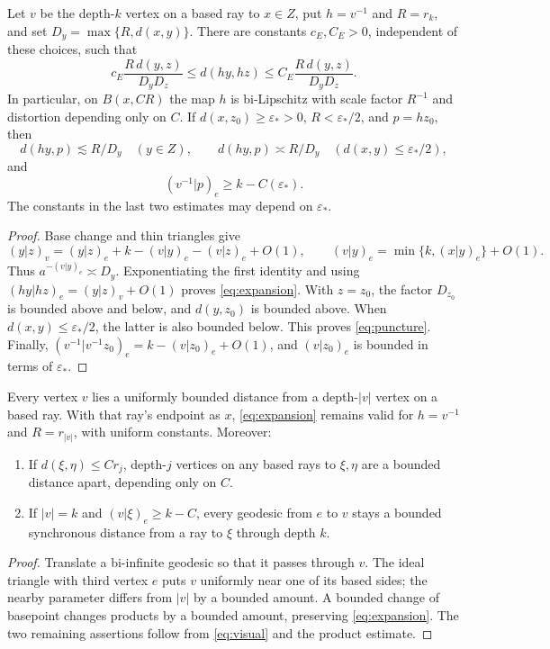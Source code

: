 \begin{lemma}
\label{lem:expansion}
Let $v$ be the depth-$k$ vertex on a based ray to $x\in Z$, put
$h=v^{-1}$ and $R=r_k$, and set $D_y=\max\{R,d(x,y)\}$.
There are constants $c_E,C_E>0$, independent of these choices, such that
\begin{equation}
 c_E\frac{R\,d(y,z)}{D_yD_z}
 \le d(hy,hz)\le C_E\frac{R\,d(y,z)}{D_yD_z}.
 \label{eq:expansion}
\end{equation}
In particular, on $B(x,CR)$ the map $h$ is bi-Lipschitz with scale
factor $R^{-1}$ and distortion depending only on $C$.
If $d(x,z_0)\ge\varepsilon_*>0$, $R<\varepsilon_*/2$, and $p=hz_0$, then
\begin{equation}
 d(hy,p)\lesssim R/D_y\quad(y\in Z),\qquad
 d(hy,p)\asymp R/D_y\quad(d(x,y)\le\varepsilon_*/2),
 \label{eq:puncture}
\end{equation}
and
\begin{equation}
 (v^{-1}|p)_e\ge k-C(\varepsilon_*).
 \label{eq:inverse-prefix}
\end{equation}
The constants in the last two estimates may depend on $\varepsilon_*$.
\end{lemma}
\begin{proof}
Base change and thin triangles give
\[
 (y|z)_v=(y|z)_e+k-(v|y)_e-(v|z)_e+O(1),
 \qquad (v|y)_e=\min\{k,(x|y)_e\}+O(1).
\]
Thus $a^{-(v|y)_e}\asymp D_y$. Exponentiating the first identity
and using $(hy|hz)_e=(y|z)_v+O(1)$ proves
\eqref{eq:expansion}. With $z=z_0$, the factor $D_{z_0}$ is bounded
above and below, and $d(y,z_0)$ is bounded above. When
$d(x,y)\le\varepsilon_*/2$, the latter is also bounded below.
This proves \eqref{eq:puncture}. Finally,
$(v^{-1}|v^{-1}z_0)_e=k-(v|z_0)_e+O(1)$, and
$(v|z_0)_e$ is bounded in terms of $\varepsilon_*$.
\end{proof}

\begin{lemma}[Prefixes]
\label{lem:prefix}
Every vertex $v$ lies a uniformly bounded distance from a depth-$|v|$
vertex on a based ray. With that ray's endpoint as $x$,
\eqref{eq:expansion} remains valid for $h=v^{-1}$ and $R=r_{|v|}$,
with uniform constants. Moreover:
\begin{enumerate}[label=\textup{(\roman*)}]
\item If $d(\xi,\eta)\le Cr_j$, depth-$j$ vertices on any based
rays to $\xi,\eta$ are a bounded distance apart, depending only on $C$.
\item If $|v|=k$ and $(v|\xi)_e\ge k-C$, every geodesic from $e$
to $v$ stays a bounded synchronous distance from a ray to $\xi$
through depth $k$.
\end{enumerate}
\end{lemma}
\begin{proof}
Translate a bi-infinite geodesic so that it passes through $v$.
The ideal triangle with third vertex $e$ puts $v$ uniformly near one
of its based sides; the nearby parameter differs from $|v|$ by a
bounded amount. A bounded change of basepoint changes products by a
bounded amount, preserving \eqref{eq:expansion}. The two remaining
assertions follow from \eqref{eq:visual} and the product estimate.
\end{proof}

